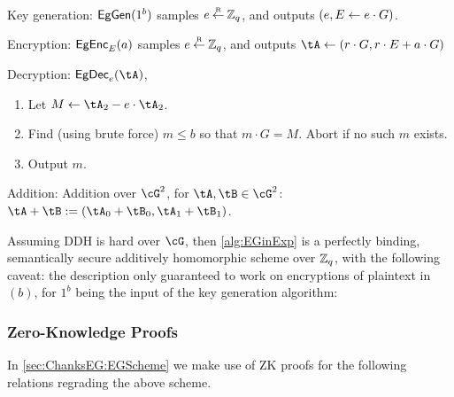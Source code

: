 \begin{algorithm}\label{alg:EGinExp}~
	
	
\item[Key generation:] $\mathsf{EgGen}(1^b)$ samples $e\mathbin{\stackrel{\mbox{\tiny R}}{\leftarrow}} {\mathbb Z}_q$, and outputs $(e,E\leftarrow  e\cdot G)$.
	
	\item[Encryption:] $\mathsf{EgEnc}_E(a)$  samples $e\mathbin{\stackrel{\mbox{\tiny R}}{\leftarrow}} {\mathbb Z}_q$, and outputs  $\tA \asn (r\cdot G, r\cdot E + a \cdot G)$
	
	
		\item[Decryption:] $\EgDec_e(\tA)$,   
		\begin{enumerate}
			\item 	Let $M \asn \tA_2 - e\cdot \tA_2$.
			
			\item Find (using brute force) $m\le b$ so that $m\cdot G = M$. Abort if no such $m$ exists.
			
			\item Output $m$.
		\end{enumerate}
		
		\item[Addition:] Addition over  $\cG^2$, \ie for $\tA,\tB \in \cG^2$: $\tA +\tB \eqdef (\tA_0+\tB_0,\tA_1+\tB_1)$.
\end{algorithm}	


\begin{theorem}\label{thm:EGinExp}
	Assuming DDH is hard over $\cG$, then \cref{alg:EGinExp} is  a perfectly binding,  semantically secure additively homomorphic scheme over ${\mathbb Z}_q$, with the following caveat:  the description only guaranteed to work on encryptions of plaintext in $(b)$,   for $1^b$ being the input of the key generation algorithm:
\end{theorem}



\subsubsection{Zero-Knowledge Proofs}
In \cref{sec:ChanksEG:EGScheme} we make use of ZK proofs for the following relations regrading the above scheme. 
	
